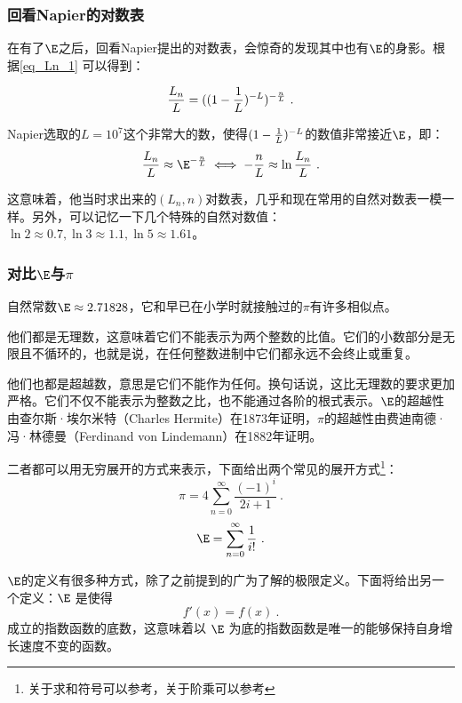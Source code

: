 \subsubsection{回看Napier的对数表}

在有了$\E$之后，回看Napier提出的对数表，会惊奇的发现其中也有$\E$的身影。根据\autoref{eq_Ln_1} 可以得到：

\begin{equation}
{L_n\over L}=((1-{1\over L})^{-L})^{-{n\over L}}~.
\end{equation}

Napier选取的$L=10^7$这个非常大的数，使得$(1-{1\over L})^{-L}$的数值非常接近$\E$，即：
\begin{equation}
{L_n\over L}\approx\E^{-{n\over L}}\iff-{n\over L}\approx\ln{L_n\over L}~.
\end{equation}

这意味着，他当时求出来的$(L_n,n)$对数表，几乎和现在常用的自然对数表一模一样。另外，可以记忆一下几个特殊的自然对数值：$\ln2\approx0.7,\ln3\approx1.1,\ln5\approx1.61$。

\subsubsection{对比$\E$与$\pi$}

自然常数$\E \approx 2.71828$，它和早已在小学时就接触过的$\pi$有许多相似点。

他们都是无理数，这意味着它们不能表示为两个整数的比值。它们的小数部分是无限且不循环的，也就是说，在任何整数进制中它们都永远不会终止或重复。

他们也都是超越数，意思是它们不能作为任何。换句话说，这比无理数的要求更加严格。它们不仅不能表示为整数之比，也不能通过各阶的根式表示。$\E$的超越性由查尔斯·埃尔米特（Charles Hermite）在1873年证明，$\pi$的超越性由费迪南德·冯·林德曼（Ferdinand von Lindemann）在1882年证明。

二者都可以用无穷展开的方式来表示，下面给出两个常见的展开方式\footnote{关于求和符号可以参考，关于阶乘可以参考}：
\begin{equation}
\pi=4\sum_{n=0}^\infty\frac{(-1)^i}{2i+1}~.
\end{equation}
\begin{equation}
\E=\sum_{n=0}^\infty\frac{1}{i!}~.
\end{equation}

$\E$的定义有很多种方式，除了之前提到的广为了解的极限定义。下面将给出另一个定义：$\E$ 是使得
\begin{equation}
f'(x) = f(x)~.
\end{equation}
成立的指数函数的底数，这意味着以 $\E$ 为底的指数函数是唯一的能够保持自身增长速度不变的函数。

